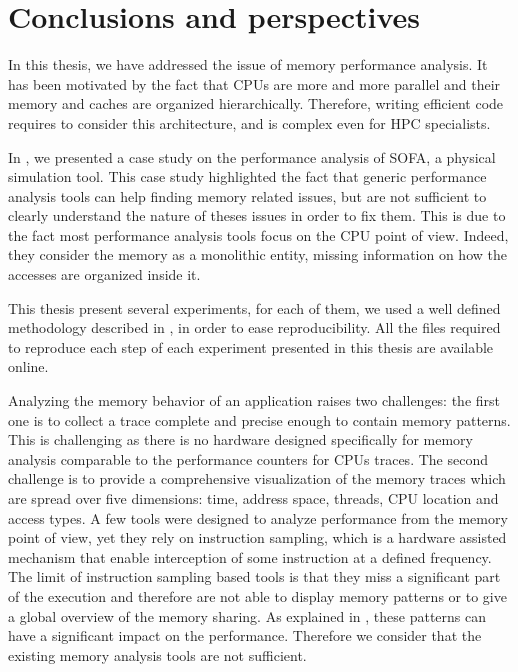 \chapter{Conclusions and perspectives}
\label{chap:cncl}

In this thesis, we have addressed the issue of memory performance analysis.
It has been motivated by the fact that \glspl{CPU} are more and more parallel and their memory and caches are organized hierarchically.
Therefore, writing efficient code requires to consider this architecture, and is complex even for \gls{HPC} specialists.

In , we presented a case study on the performance analysis of \gls{SOFA}, a physical simulation tool.
This case study highlighted the fact that generic performance analysis tools can help finding memory related issues, but are not sufficient to clearly understand the nature of theses issues in order to fix them.
This is due to the fact most performance analysis tools focus on the \gls{CPU} point of view.
Indeed, they consider the memory as a monolithic entity, missing information on how the accesses are organized inside it.

This thesis present several experiments, for each of them, we used a well defined methodology described in , in order to ease reproducibility.
All the files required to reproduce each step of each experiment presented in this thesis are available online.

Analyzing the memory behavior of an application raises two challenges: the first one is to collect a trace complete and precise enough to contain memory patterns.
This is challenging as there is no hardware designed specifically for memory analysis comparable to the performance counters for \glspl{CPU} traces.
The second challenge is to provide a comprehensive visualization of the memory traces which are spread over five dimensions: time, address space, threads, \gls{CPU} location and access types.
A few tools were designed to analyze performance from the memory point of view, yet they rely on instruction sampling, which is a hardware assisted mechanism that enable interception of some instruction at a defined frequency.
The limit of instruction sampling based tools is that they miss a significant part of the execution and therefore are not able to display memory patterns or to give a global overview of the memory sharing.
As explained in , these patterns can have a significant impact on the performance.
Therefore we consider that the existing memory analysis tools are not sufficient.

